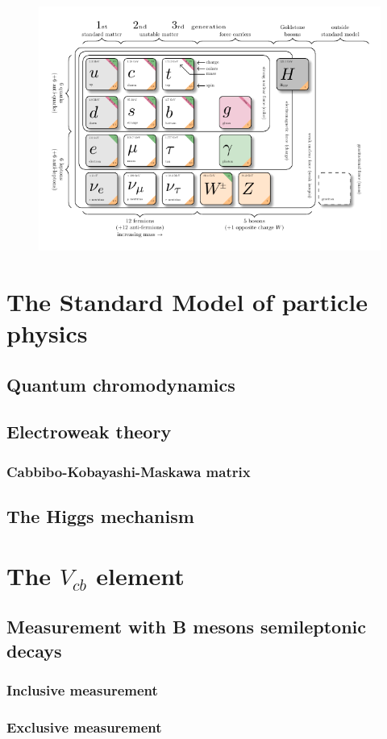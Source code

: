 \begin{figure}
    \centering
    \includegraphics[width=1\linewidth]{fig//chap02-theory/sm-particles.pdf}
    \caption{\cite{BurgardCarstenStandardExample}}
    \label{fig:SMpart}
\end{figure}

\section{The Standard Model of particle physics}

\subsection{Quantum chromodynamics}

\subsection{Electroweak theory}

\subsubsection*{Cabbibo-Kobayashi-Maskawa matrix}

\subsection{The Higgs mechanism}

\section{The $V_{cb}$ element}

\subsection{Measurement with B mesons semileptonic decays}

\subsubsection*{Inclusive measurement}

\subsubsection*{Exclusive measurement}

